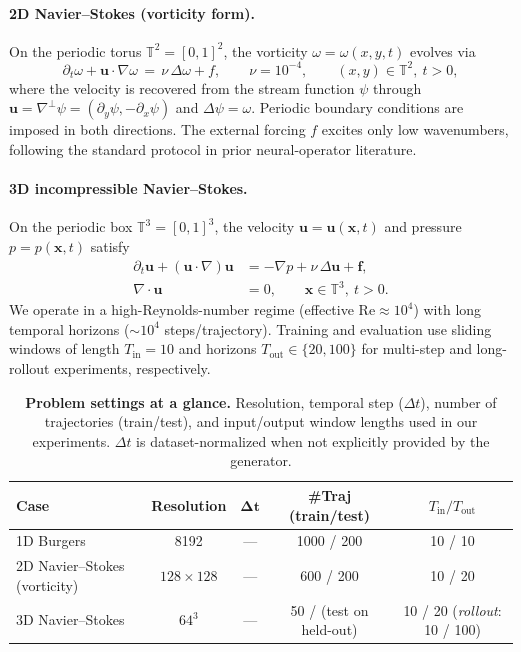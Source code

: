 \documentclass[11pt]{article}
\begin{document}
\paragraph{2D Navier--Stokes (vorticity form).} On the periodic torus $\mathbb{T}^2=[0,1]^2$, the vorticity $\omega=\omega(x,y,t)$ evolves via
\begin{equation}
\partial_t \omega + \mathbf{u}\cdot\nabla \omega \,=\, \nu\,\Delta\omega + f,\qquad \nu=10^{-4},\qquad (x,y)\in\mathbb{T}^2,\ t>0,
\end{equation}
where the velocity is recovered from the stream function $\psi$ through $\mathbf{u}=\nabla^\perp\psi=(\partial_y\psi,-\partial_x\psi)$ and $\Delta\psi=\omega$. Periodic boundary conditions are imposed in both directions. The external forcing $f$ excites only low wavenumbers, following the standard protocol in prior neural-operator literature.

\paragraph{3D incompressible Navier--Stokes.} On the periodic box $\mathbb{T}^3=[0,1]^3$, the velocity $\mathbf{u}=\mathbf{u}(\mathbf{x},t)$ and pressure $p=p(\mathbf{x},t)$ satisfy
\begin{align}
\partial_t \mathbf{u} + (\mathbf{u}\cdot\nabla)\mathbf{u} &= -\nabla p + \nu\,\Delta \mathbf{u} + \mathbf{f},\\
\nabla\cdot\mathbf{u} &= 0,\qquad \mathbf{x}\in\mathbb{T}^3,\ t>0.
\end{align}
We operate in a high-Reynolds-number regime (effective $\mathrm{Re}\approx10^4$) with long temporal horizons ($\sim10^4$ steps/trajectory). Training and evaluation use sliding windows of length $T_{\mathrm{in}}=10$ and horizons $T_{\mathrm{out}}\in\{20,100\}$ for multi-step and long-rollout experiments, respectively.

\begin{table}[h]
\centering
\caption{\textbf{Problem settings at a glance.} Resolution, temporal step (\(\Delta t\)), number of trajectories (train/test), and input/output window lengths used in our experiments. \(\Delta t\) is dataset-normalized when not explicitly provided by the generator.}
\label{tab:problem_settings}
\small
\begin{tabular}{@{}lcccc@{}}
\toprule
\textbf{Case} & \textbf{Resolution} & \(\boldsymbol{\Delta t}\) & \textbf{\#Traj (train/test)} & \textbf{\(T_{\mathrm{in}}/T_{\mathrm{out}}\)} \\
\midrule
1D Burgers & 8192 & --- & 1000 / 200 & 10 / 10 \\
2D Navier--Stokes (vorticity) & $128\times128$ & --- & 600 / 200 & 10 / 20 \\
3D Navier--Stokes & $64^3$ & --- & 50 / (test on held-out) & 10 / 20 (\textit{rollout}: 10 / 100) \\
\bottomrule
\end{tabular}
\end{table}
\end{document}
